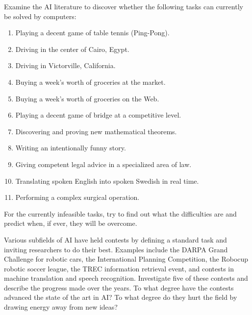 \begin{exercise}\libex
Examine the AI literature to discover whether  the following
tasks can currently be solved by computers:
\begin{enumerate}
\item Playing a decent game of table tennis (Ping-Pong).
\item Driving in the center of Cairo, Egypt.
\item Driving in Victorville, California.
\item Buying a week's worth of groceries at the market.
\item Buying a week's worth of groceries on the Web.
\item Playing a decent game of bridge at a competitive level.
\item Discovering and proving new mathematical theorems.
\item Writing an intentionally funny story.
\item Giving competent legal advice in a specialized area of law.
\item Translating spoken English into spoken Swedish in real time.
\item Performing a complex surgical operation.
\end{enumerate}
For the currently infeasible tasks, try to find out what the
difficulties are and predict  when, if ever, they will be overcome.
\end{exercise} 

\begin{exercise}
Various subfields of AI have held contests by defining a standard task
and inviting researchers to do their best.  Examples include the DARPA
Grand Challenge for robotic cars, the International Planning
Competition, the Robocup robotic soccer league, the TREC information
retrieval event, and contests in machine translation and speech
recognition. Investigate five of these contests and describe the
progress made over the years. To what degree have the contests
advanced the state of the art in AI?  To what degree do they hurt the field
by drawing energy away from new ideas?
\end{exercise} 




